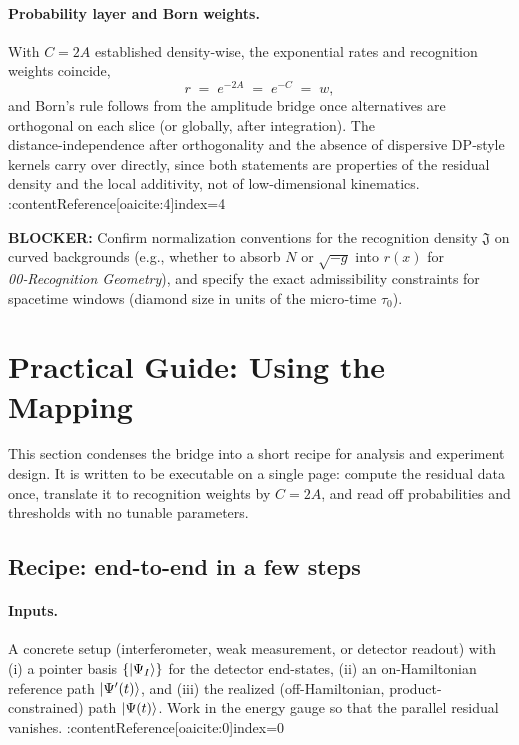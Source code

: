 \documentclass[11pt,letterpaper]{article}
\begin{document}
\paragraph{Probability layer and Born weights.}
With \(C=2A\) established density‑wise, the exponential rates and recognition weights coincide,
\begin{equation}
r\;=\;e^{-2A}\;=\;e^{-C}\;=\;w,
\end{equation}
and Born’s rule follows from the amplitude bridge once alternatives are orthogonal on each slice (or globally, after integration). The distance‑independence after orthogonality and the absence of dispersive DP‑style kernels carry over directly, since both statements are properties of the residual density and the local additivity, not of low‑dimensional kinematics. :contentReference[oaicite:4]{index=4}

\medskip
\noindent\textbf{BLOCKER:} Confirm normalization conventions for the recognition density \(\mathfrak J\) on curved backgrounds (e.g., whether to absorb \(N\) or \(\sqrt{-g}\) into \(r(x)\) for \emph{00‑Recognition Geometry}), and specify the exact admissibility constraints for spacetime windows (diamond size in units of the micro‑time \(\tau_0\)).

\section{Practical Guide: Using the Mapping}
\label{sec:practical-guide}

This section condenses the bridge into a short recipe for analysis and experiment design. It is written to be executable on a single page: compute the residual data once, translate it to recognition weights by \(C=2A\), and read off probabilities and thresholds with no tunable parameters.

\subsection{Recipe: end-to-end in a few steps}

\paragraph{Inputs.}
A concrete setup (interferometer, weak measurement, or detector readout) with
(i) a pointer basis \(\{\ket{\Psi_I}\}\) for the detector end-states,
(ii) an on-Hamiltonian reference path \(\ket{\Psi'(t)}\), and
(iii) the realized (off-Hamiltonian, product-constrained) path \(\ket{\Psi(t)}\).
Work in the energy gauge so that the parallel residual vanishes. :contentReference[oaicite:0]{index=0}
\end{document}
